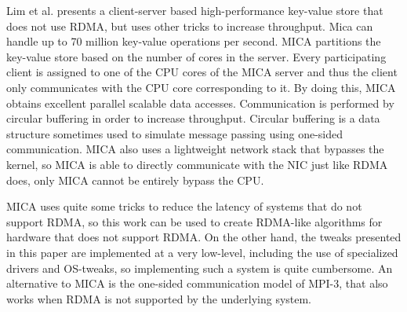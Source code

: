 Lim et al. \cite{mica} presents a client-server based high-performance key-value store that does not use RDMA, but uses other tricks to increase throughput. Mica can handle up to 70 million key-value operations per second. MICA partitions the key-value store based on the number of cores in the server. Every participating client is assigned to one of the CPU cores of the MICA server and thus the client only communicates with the CPU core corresponding to it. By doing this, MICA obtains excellent parallel scalable data accesses. Communication is performed by circular buffering in order to increase throughput. Circular buffering is a data structure sometimes used to simulate message passing using one-sided communication. MICA also uses a lightweight network stack that bypasses the kernel, so MICA is able to directly communicate with the NIC just like RDMA does, only MICA cannot be entirely bypass the CPU.

MICA uses quite some tricks to reduce the latency of systems that do not support RDMA, so this work can be used to create RDMA-like algorithms for hardware that does not support RDMA. On the other hand, the tweaks presented in this paper are implemented at a very low-level, including the use of specialized drivers and OS-tweaks, so implementing such a system is quite cumbersome. An alternative to MICA is the one-sided communication model of MPI-3, that also works when RDMA is not supported by the underlying system.
